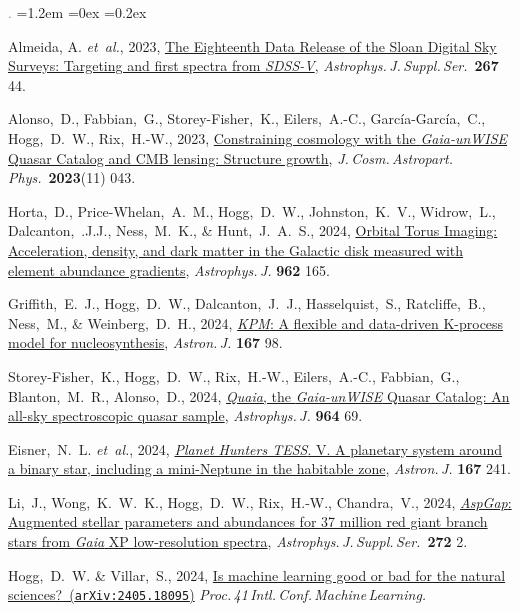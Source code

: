 \documentclass[10pt,letterpaper]{article}
\newcommand{\foreign}[1]{\textsl{#1}}
\newcommand{\etal}{\foreign{et~al.}}
\newcommand{\project}[1]{\textsl{#1}}
\newcommand{\doi}[2]{\href{http://dx.doi.org/#1}{{#2}}}
\newcommand{\arxiv}[2]{\href{http://arxiv.org/abs/#1}{{#2}\ (\texttt{arXiv:#1})}}
\newcommand{\deemph}[1]{\textcolor{grey}{\footnotesize{#1}}}
\newcommand{\pubnumber}[1]{\deemph{{#1}.}}
\newcounter{refpubnum}
\newcommand{\hogglist}{%
    \rightmargin=0in
    \leftmargin=1.2em
    \topsep=0ex
    \partopsep=0pt
    \itemsep=0.2ex
    \parsep=0pt
    \itemindent=-1.0\leftmargin
    \listparindent=0.0\leftmargin
    \settowidth{\labelsep}{~}
    \usecounter{refpubnum}
  }
\begin{document}
\begin{list}{\pubnumber{\therefpubnum}}{\hogglist}
\item
  Almeida, A. \etal, 2023,
  \doi{10.3847/1538-4365/acda98}{The Eighteenth Data Release of the Sloan Digital Sky Surveys: Targeting and first spectra from \project{SDSS-V}},
  \textit{Astrophys.\,J.\,Suppl.\,Ser.}\ \textbf{267} 44.
\item
  Alonso,~D., Fabbian,~G., Storey-Fisher,~K., Eilers,~A.-C., Garc\'ia-Garc\'ia,~C.,
  Hogg,~D.~W., Rix,~H.-W., 2023,
  \doi{10.1088/1475-7516/2023/11/043}{Constraining cosmology with the \project{Gaia-unWISE} Quasar Catalog and CMB lensing: Structure growth},
  \textit{J.\,Cosm.\,Astropart.\,Phys.}\ \textbf{2023}(11) 043.
\item
  Horta,~D., Price-Whelan,~A.~M., Hogg,~D.~W., Johnston,~K.~V., Widrow,~L., Dalcanton,~.J.J., Ness,~M.~K.,
  \& Hunt,~J.~A.~S., 2024,
  \doi{10.3847/1538-4357/ad16e8}{Orbital Torus Imaging: Acceleration, density, and dark matter in the Galactic disk measured with element abundance gradients},
  \textit{Astrophys.\,J.} \textbf{962} 165.
\item
  Griffith,~E.~J., Hogg,~D.~W., Dalcanton,~J.~J., Hasselquist,~S., Ratcliffe,~B., Ness,~M., \& Weinberg,~D.~H., 2024,
  \doi{10.3847/1538-3881/ad19c7}{\project{KPM}: A flexible and data-driven K-process model for nucleosynthesis},
  \textit{Astron.\,J.} \textbf{167} 98.
\item
  Storey-Fisher,~K., Hogg,~D.~W., Rix,~H.-W., Eilers,~A.-C., Fabbian,~G., Blanton,~M.~R., Alonso,~D., 2024,
  \doi{10.3847/1538-4357/ad1328}{\project{Quaia}, the \project{Gaia-unWISE} Quasar Catalog: An all-sky spectroscopic quasar sample},
  \textit{Astrophys.\,J.} \textbf{964} 69.
\item
  Eisner,~N.~L. \etal, 2024,
  \doi{10.3847/1538-3881/ad1d5c}{\project{Planet Hunters TESS}. V. A planetary system around a binary star, including a mini-Neptune in the habitable zone},
  \textit{Astron.\,J.} \textbf{167} 241.
\item
  Li,~J., Wong,~K.~W.~K., Hogg,~D.~W., Rix,~H.-W., Chandra,~V., 2024,
  \doi{10.3847/1538-4365/ad2b4d}{\project{AspGap}: Augmented stellar parameters and abundances for 37 million red giant branch stars from \project{Gaia} XP low-resolution spectra},
  \textit{Astrophys.\,J.\,Suppl.\,Ser.}\ \textbf{272} 2.  
\item
  Hogg,~D.~W. \& Villar,~S., 2024,
  \arxiv{2405.18095}{Is machine learning good or bad for the natural sciences?}
  \textit{Proc.\,41\,Intl.\,Conf.\,Machine\,Learning.}
\label{rpcount}\end{list}
\end{document}
